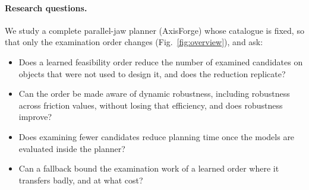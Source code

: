 \documentclass[pdflatex,sn-mathphys-num,iicol]{sn-jnl}
\begin{document}
\paragraph{Research questions.} We study a complete parallel-jaw planner (AxisForge) whose catalogue is fixed, so that only the examination order changes (Fig.~\ref{fig:overview}), and ask:
\begin{itemize}
\item[RQ1] Does a learned feasibility order reduce the number of examined candidates on objects that were not used to design it, and does the reduction replicate?
\item[RQ2] Can the order be made aware of dynamic robustness, including robustness across friction values, without losing that efficiency, and does robustness improve?
\item[RQ3] Does examining fewer candidates reduce planning time once the models are evaluated inside the planner?
\item[RQ4] Can a fallback bound the examination work of a learned order where it transfers badly, and at what cost?
\end{itemize}
\end{document}
